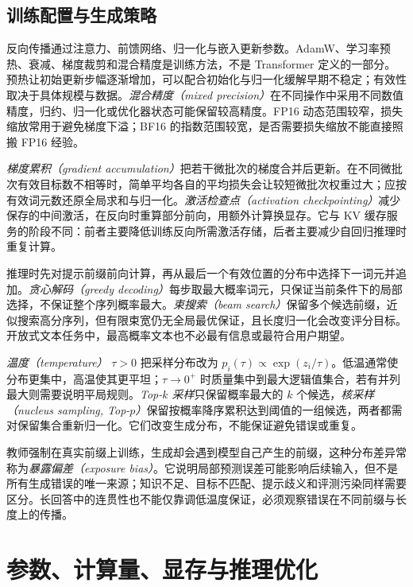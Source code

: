 \documentclass[UTF8,12pt,a4paper,fontset=fandol]{ctexart}
\begin{document}
\subsection{训练配置与生成策略}

反向传播通过注意力、前馈网络、归一化与嵌入更新参数。AdamW、学习率预热、衰减、梯度裁剪和混合精度是训练方法，不是 Transformer 定义的一部分。预热让初始更新步幅逐渐增加，可以配合初始化与归一化缓解早期不稳定；有效性取决于具体规模与数据。\emph{混合精度（mixed precision）}在不同操作中采用不同数值精度，归约、归一化或优化器状态可能保留较高精度。FP16 动态范围较窄，损失缩放常用于避免梯度下溢；BF16 的指数范围较宽，是否需要损失缩放不能直接照搬 FP16 经验。

\emph{梯度累积（gradient accumulation）}把若干微批次的梯度合并后更新。在不同微批次有效目标数不相等时，简单平均各自的平均损失会让较短微批次权重过大；应按有效词元数还原全局求和与归一化。\emph{激活检查点（activation checkpointing）}减少保存的中间激活，在反向时重算部分前向，用额外计算换显存。它与 KV 缓存服务的阶段不同：前者主要降低训练反向所需激活存储，后者主要减少自回归推理时重复计算。

推理时先对提示前缀前向计算，再从最后一个有效位置的分布中选择下一词元并追加。\emph{贪心解码（greedy decoding）}每步取最大概率词元，只保证当前条件下的局部选择，不保证整个序列概率最大。\emph{束搜索（beam search）}保留多个候选前缀，近似搜索高分序列，但有限束宽仍无全局最优保证，且长度归一化会改变评分目标。开放式文本任务中，最高概率文本也不必最有信息或最符合用户期望。

\emph{温度（temperature）} $\tau>0$ 把采样分布改为 $p_i(\tau)\propto\exp(z_i/\tau)$。低温通常使分布更集中，高温使其更平坦；$\tau\to0^+$ 时质量集中到最大逻辑值集合，若有并列最大则需要说明平局规则。\emph{Top-$k$ 采样}只保留概率最大的 $k$ 个候选，\emph{核采样（nucleus sampling, Top-$p$）}保留按概率降序累积达到阈值的一组候选，两者都需对保留集合重新归一化。它们改变生成分布，不能保证避免错误或重复。

教师强制在真实前缀上训练，生成却会遇到模型自己产生的前缀，这种分布差异常称为\emph{暴露偏差（exposure bias）}。它说明局部预测误差可能影响后续输入，但不是所有生成错误的唯一来源；知识不足、目标不匹配、提示歧义和评测污染同样需要区分。长回答中的连贯性也不能仅靠调低温度保证，必须观察错误在不同前缀与长度上的传播。

\section{参数、计算量、显存与推理优化}
\label{sec:tr-efficiency}
\end{document}

